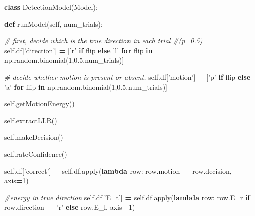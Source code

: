 \documentclass[12pt,twoside]{reedthesis}
\newenvironment{Shaded}{\begin{snugshade}}{\end{snugshade}}
\newcommand{\BuiltInTok}[1]{#1}
\newcommand{\CommentTok}[1]{\textcolor[rgb]{0.56,0.35,0.01}{\textit{#1}}}
\newcommand{\ControlFlowTok}[1]{\textcolor[rgb]{0.13,0.29,0.53}{\textbf{#1}}}
\newcommand{\DecValTok}[1]{\textcolor[rgb]{0.00,0.00,0.81}{#1}}
\newcommand{\FloatTok}[1]{\textcolor[rgb]{0.00,0.00,0.81}{#1}}
\newcommand{\KeywordTok}[1]{\textcolor[rgb]{0.13,0.29,0.53}{\textbf{#1}}}
\newcommand{\NormalTok}[1]{#1}
\newcommand{\OperatorTok}[1]{\textcolor[rgb]{0.81,0.36,0.00}{\textbf{#1}}}
\newcommand{\StringTok}[1]{\textcolor[rgb]{0.31,0.60,0.02}{#1}}
\newcommand{\VariableTok}[1]{\textcolor[rgb]{0.00,0.00,0.00}{#1}}
\begin{document}
\begin{Shaded}
\begin{Highlighting}[]
\KeywordTok{class}\NormalTok{ DetectionModel(Model):}
    
    \KeywordTok{def}\NormalTok{ runModel(}\VariableTok{self}\NormalTok{, num_trials):}

        \CommentTok{# first, decide which is the true direction in each trial }
        \CommentTok{#(p=0.5)}
        \VariableTok{self}\NormalTok{.df[}\StringTok{'direction'}\NormalTok{] }\OperatorTok{=}\NormalTok{ [}\StringTok{'r'} \ControlFlowTok{if}\NormalTok{ flip }\ControlFlowTok{else} \StringTok{'l'} 
               \ControlFlowTok{for}\NormalTok{ flip }\KeywordTok{in}\NormalTok{ np.random.binomial(}\DecValTok{1}\NormalTok{,}\FloatTok{0.5}\NormalTok{,num_trials)] }
        
        \CommentTok{# decide whether motion is present or absent.}
        \VariableTok{self}\NormalTok{.df[}\StringTok{'motion'}\NormalTok{] }\OperatorTok{=}\NormalTok{ [}\StringTok{'p'} \ControlFlowTok{if}\NormalTok{ flip }\ControlFlowTok{else} \StringTok{'a'} 
               \ControlFlowTok{for}\NormalTok{ flip }\KeywordTok{in}\NormalTok{ np.random.binomial(}\DecValTok{1}\NormalTok{,}\FloatTok{0.5}\NormalTok{,num_trials)] }
        
        \VariableTok{self}\NormalTok{.getMotionEnergy()}
        
        \VariableTok{self}\NormalTok{.extractLLR()}

        \VariableTok{self}\NormalTok{.makeDecision()}

        \VariableTok{self}\NormalTok{.rateConfidence()}
        
        \VariableTok{self}\NormalTok{.df[}\StringTok{'correct'}\NormalTok{] }\OperatorTok{=} \VariableTok{self}\NormalTok{.df.}\BuiltInTok{apply}\NormalTok{(}\KeywordTok{lambda}\NormalTok{ row: }
\NormalTok{               row.motion}\OperatorTok{==}\NormalTok{row.decision, }
\NormalTok{               axis}\OperatorTok{=}\DecValTok{1}\NormalTok{)}
        
         \CommentTok{#energy in true direction}
        \VariableTok{self}\NormalTok{.df[}\StringTok{'E_t'}\NormalTok{] }\OperatorTok{=} \VariableTok{self}\NormalTok{.df.}\BuiltInTok{apply}\NormalTok{(}\KeywordTok{lambda}\NormalTok{ row: }
\NormalTok{               row.E_r }\ControlFlowTok{if}\NormalTok{ row.direction}\OperatorTok{==}\StringTok{'r'} 
               \ControlFlowTok{else}\NormalTok{ row.E_l, }
\NormalTok{               axis}\OperatorTok{=}\DecValTok{1}\NormalTok{)}
        

\end{Highlighting}
\end{Shaded}
\end{document}
